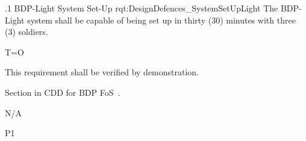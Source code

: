 \ONERQMTVKSA
{\RqtNumberBase.1}
{BDP-Light System Set-Up}
{rqt:DesignDefences_SystemSetUpLight}
{The BDP-Light system shall be capable of being set up in thirty (30) minutes with three (3) soldiers.}
{
	\item [Phase 1] T=O
}
{This requirement shall be verified by demonstration.}
{
\item [5.5.16.2] Section in CDD for BDP FoS~\cite{ref__BDP_FOS_CDD}.
}
{
	\item N/A
}
{P1}

